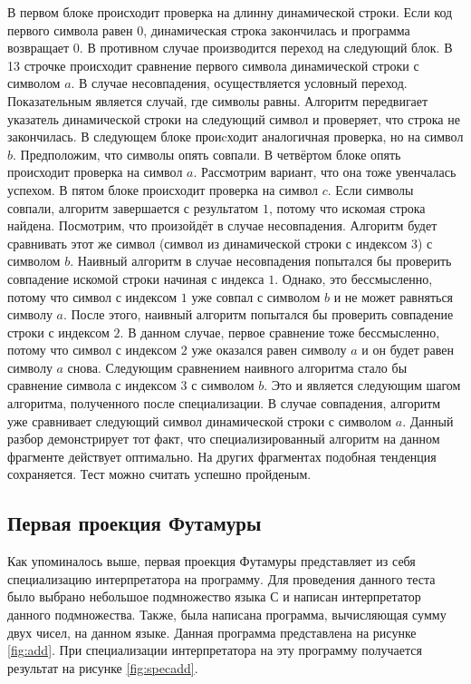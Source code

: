В первом блоке происходит проверка на длинну динамической строки. Если код первого символа равен $0$, динамическая строка закончилась и программа возвращает $0$. В противном случае производится переход на следующий блок. В 13 строчке происходит сравнение первого символа динамической строки с символом $a$. В случае несовпадения, осуществляется условный переход. Показательным является случай, где символы равны. Алгоритм передвигает указатель динамической строки на следующий символ и проверяет, что строка не закончилась. В следующем блоке проиcходит аналогичная проверка, но на символ $b$. Предположим, что символы опять совпали. В четвёртом блоке опять происходит проверка на символ $a$. Рассмотрим вариант, что она тоже увенчалась успехом. В пятом блоке происходит проверка на символ $c$. Если символы совпали, алгоритм завершается с результатом $1$, потому что искомая строка найдена. Посмотрим, что произойдёт в случае несовпадения. Алгоритм будет сравнивать этот же символ (символ из динамической строки с индексом 3) с символом $b$. Наивный алгоритм в случае несовпадения попытался бы проверить совпадение искомой строки начиная с индекса $1$. Однако, это бессмысленно, потому что символ с индексом $1$ уже совпал с символом $b$ и не может равняться символу $a$. После этого, наивный алгоритм попытался бы проверить совпадение строки с индексом $2$. В данном случае, первое сравнение тоже бессмысленно, потому что символ с индексом $2$ уже оказался равен символу $a$ и он будет равен символу $a$ снова. Следующим сравнением наивного алгоритма стало бы сравнение символа с индексом $3$ с символом $b$. Это и является следующим шагом алгоритма, полученного после специализации. В случае совпадения, алгоритм уже сравнивает следующий символ динамической строки с символом $a$. Данный разбор демонстрирует тот факт, что специализированный алгоритм на данном фрагменте действует оптимально. На других фрагментах подобная тенденция сохраняется. Тест можно считать успешно пройденым.

\subsection{ Первая проекция Футамуры}

Как упоминалось выше, первая проекция Футамуры представляет из себя специализацию интерпретатора на программу. Для проведения данного теста было выбрано небольшое подмножество языка С и написан интерпретатор данного подмножества. Также, была написана программа, вычисляющая сумму двух чисел, на данном языке. Данная программа представлена на рисунке \ref{fig:add}. При специализации интерпретатора на эту программу получается результат на рисунке \ref{fig:specadd}.

